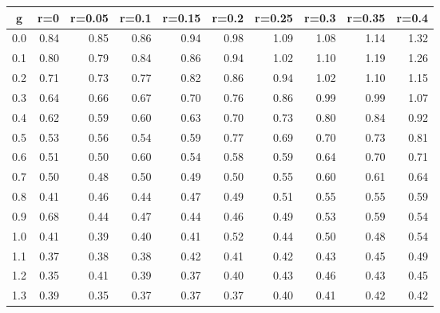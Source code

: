 %
\begin{table}[!tbp]
 \begin{center}
 \begin{tabular}{rrrrrrrrrr}\hline\hline
\multicolumn{1}{c}{g}&\multicolumn{1}{c}{r=0}&\multicolumn{1}{c}{r=0.05}&\multicolumn{1}{c}{r=0.1}&\multicolumn{1}{c}{r=0.15}&\multicolumn{1}{c}{r=0.2}&\multicolumn{1}{c}{r=0.25}&\multicolumn{1}{c}{r=0.3}&\multicolumn{1}{c}{r=0.35}&\multicolumn{1}{c}{r=0.4}\tabularnewline
\hline
0.0&0.84&0.85&0.86&0.94&0.98&1.09&1.08&1.14&1.32\tabularnewline
0.1&0.80&0.79&0.84&0.86&0.94&1.02&1.10&1.19&1.26\tabularnewline
0.2&0.71&0.73&0.77&0.82&0.86&0.94&1.02&1.10&1.15\tabularnewline
0.3&0.64&0.66&0.67&0.70&0.76&0.86&0.99&0.99&1.07\tabularnewline
0.4&0.62&0.59&0.60&0.63&0.70&0.73&0.80&0.84&0.92\tabularnewline
0.5&0.53&0.56&0.54&0.59&0.77&0.69&0.70&0.73&0.81\tabularnewline
0.6&0.51&0.50&0.60&0.54&0.58&0.59&0.64&0.70&0.71\tabularnewline
0.7&0.50&0.48&0.50&0.49&0.50&0.55&0.60&0.61&0.64\tabularnewline
0.8&0.41&0.46&0.44&0.47&0.49&0.51&0.55&0.55&0.59\tabularnewline
0.9&0.68&0.44&0.47&0.44&0.46&0.49&0.53&0.59&0.54\tabularnewline
1.0&0.41&0.39&0.40&0.41&0.52&0.44&0.50&0.48&0.54\tabularnewline
1.1&0.37&0.38&0.38&0.42&0.41&0.42&0.43&0.45&0.49\tabularnewline
1.2&0.35&0.41&0.39&0.37&0.40&0.43&0.46&0.43&0.45\tabularnewline
1.3&0.39&0.35&0.37&0.37&0.37&0.40&0.41&0.42&0.42\tabularnewline
\hline
\end{tabular}

\end{center}

\end{table}

